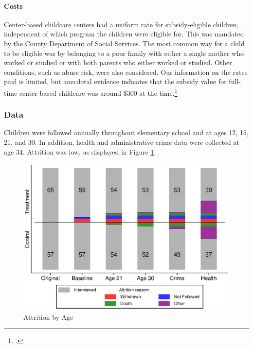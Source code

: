 \begin{appendices}
\paragraph{Costs}

\noindent Center-based childcare centers had a uniform rate for subsidy-eligible children, independent of which program the children were eligible for. This was mandated by the County Department of Social Services. The most common way for a child to be eligible was by belonging to a poor family with either a single mother who worked or studied or with both parents who either worked or studied. Other conditions, such as abuse risk, were also considered. Our information on the rates paid is limited, but anecdotal evidence indicates that the subsidy value for full-time center-based childcare was around \$300 at the time.\footnote{\citet{Kuperman_2015_Clifford-Russell-Interview}.}

\subsubsection{Data} \label{appendix:data}

Children were followed annually throughout elementary school and at ages 12, 15, 21, and 30. In addition, health and administrative crime data were collected at age 34.  Attrition was low, as displayed in Figure \ref{fig:attrition}.\\

\begin{figure}[H]
\caption{Attrition by Age} \label{fig:attrition}
    \centering
  \includegraphics[width=.9\columnwidth]{output/abc_attrition.eps}
\end{figure}


\end{appendices}

